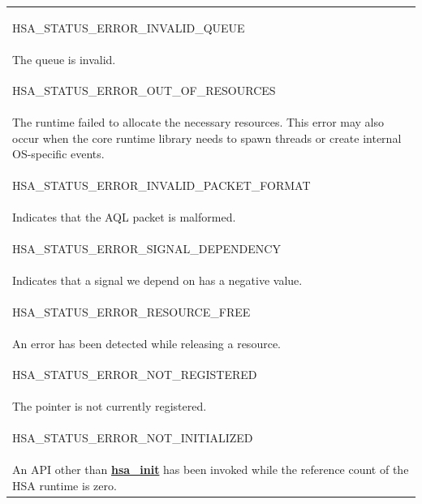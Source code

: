 \documentclass[final]{book}
\newcommand{\reffun}[1]{\textbf{#1}}
\newcommand{\reftyp}[1]{#1}
\newcommand{\refenu}[1]{\reftyp{#1}}
\begin{document}
\begin{longtable}{@{\hspace{2em}}p{\linewidth-2em}}
\hspace{-2em}\hypertarget{group__status_1ggad755322e7ff95456520e8abdbe90d225aa3c762eb6a61b358702b45259d1686c4}{\refenu{HSA_\-STATUS_\-ERROR_\-INVALID_\-QUEUE}} \\The queue is invalid.\\[2mm]
\hspace{-2em}\hypertarget{group__status_1ggad755322e7ff95456520e8abdbe90d225a1a77fcf36d0d140874c4361ab093eff7}{\refenu{HSA_\-STATUS_\-ERROR_\-OUT_\-OF_\-RESOURCES}} \\The runtime failed to allocate the necessary resources. This error may also occur when the core runtime library needs to spawn threads or create internal OS-specific events.\\[2mm]
\hspace{-2em}\hypertarget{group__status_1ggad755322e7ff95456520e8abdbe90d225a3fad45f72111eb99de5d8daef26c372c}{\refenu{HSA_\-STATUS_\-ERROR_\-INVALID_\-PACKET_\-FORMAT}} \\Indicates that the AQL packet is malformed.\\[2mm]
\hspace{-2em}\hypertarget{group__status_1ggad755322e7ff95456520e8abdbe90d225a160ebf19ea514abf81a8ac958c0e9f12}{\refenu{HSA_\-STATUS_\-ERROR_\-SIGNAL_\-DEPENDENCY}} \\Indicates that a signal we depend on has a negative value.\\[2mm]
\hspace{-2em}\hypertarget{group__status_1ggad755322e7ff95456520e8abdbe90d225a6406af88203fcbec4179fbb71cc66b65}{\refenu{HSA_\-STATUS_\-ERROR_\-RESOURCE_\-FREE}} \\An error has been detected while releasing a resource.\\[2mm]
\hspace{-2em}\hypertarget{group__status_1ggad755322e7ff95456520e8abdbe90d225a8b2f486dd206aa5545e8b0f2c1e2a568}{\refenu{HSA_\-STATUS_\-ERROR_\-NOT_\-REGISTERED}} \\The pointer is not currently registered.\\[2mm]
\hspace{-2em}\hypertarget{group__status_1ggad755322e7ff95456520e8abdbe90d225a34ea59ade5bfce95eee935238a99f5b5}{\refenu{HSA_\-STATUS_\-ERROR_\-NOT_\-INITIALIZED}} \\An API other than \hyperlink{group__initshutdown_1ga5b8574433e7dbcbd31ea397a02e3c32b}{\reffun{hsa_\-init}} has been invoked while the reference count of the HSA runtime is zero.\\[2mm]

\end{longtable}
\end{document}
